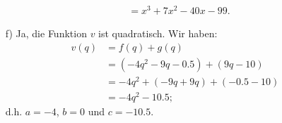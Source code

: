 \documentclass[12pt]{article}
\begin{document}
\begin{solution}
\begin{enumerate}
\begin{equation*}
\begin{split}
	  & = x^{3}+7x^{2}-40x-99.
\end{split}
\end{equation*}
\item[f)] Ja, die Funktion $v$ ist quadratisch. Wir haben:
\begin{equation*}
\begin{split}
v(q)& =f(q)+g(q)\\
	  & = (-4q^{2} -9q-0.5)+( 9q-10)\\
	  & = -4q^{2}+(-9q+9q)+(-0.5-10)\\
	  & = -4q^{2}-10.5;
\end{split}
\end{equation*}
d.h. $a=-4$, $b=0$ und $c=-10.5$. 
\end{enumerate}
\end{solution}
\end{document}

